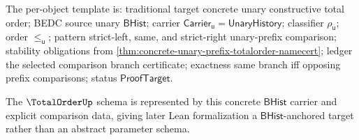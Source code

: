 The per-object template is: traditional target concrete unary constructive
total order; BEDC source unary $\mathsf{BHist}$; carrier
$\mathsf{Carrier}_{\mathsf{u}}=\mathsf{UnaryHistory}$; classifier
$\rho_{\mathsf{u}}$; order $\le_{\mathsf{u}}$; pattern strict-left,
same, and strict-right unary-prefix comparison; stability obligations from
\autoref{thm:concrete-unary-prefix-totalorder-namecert}; ledger the selected
comparison branch certificate; exactness same branch iff opposing prefix
comparisons; status $\mathsf{ProofTarget}$.

The $\TotalOrderUp$ schema is represented by this concrete $\mathsf{BHist}$
carrier and explicit comparison data, giving later Lean formalization a
$\mathsf{BHist}$-anchored target rather than an abstract parameter schema.
